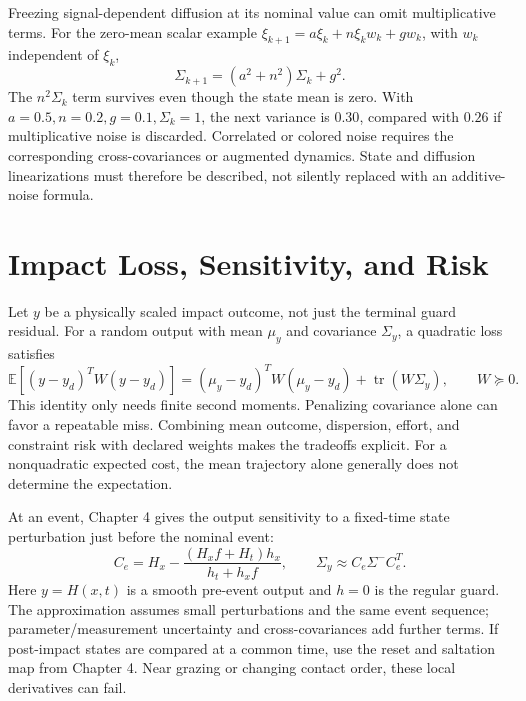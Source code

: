 \documentclass[12pt, openany]{book}
\theoremstyle{plain}
\begin{document}
Freezing signal-dependent diffusion at its nominal value can omit
multiplicative terms. For the zero-mean scalar example
$\xi_{k+1}=a\xi_k+n\xi_kw_k+g w_k$, with $w_k$ independent of $\xi_k$,
\begin{equation}\label{eq:multiplicative_covariance}
 \Sigma_{k+1}=(a^2+n^2)\Sigma_k+g^2.
\end{equation}
The $n^2\Sigma_k$ term survives even though the state mean is zero. With
$a=0.5,n=0.2,g=0.1,\Sigma_k=1$, the next variance is $0.30$, compared with
$0.26$ if multiplicative noise is discarded. Correlated or colored noise
requires the corresponding cross-covariances or augmented dynamics. State
and diffusion linearizations must therefore be described, not silently
replaced with an additive-noise formula.

\section{Impact Loss, Sensitivity, and Risk}

Let $y$ be a physically scaled impact outcome, not just the terminal guard
residual. For a random output with mean $\mu_y$
and covariance $\Sigma_y$, a quadratic loss satisfies
\begin{equation}\label{eq:ocp_output_loss}
 \mathbb E[(y-y_d)^TW(y-y_d)]
 =(\mu_y-y_d)^TW(\mu_y-y_d)+\operatorname{tr}(W\Sigma_y),
 \qquad W\succeq0.
\end{equation}
This identity only needs finite second moments. Penalizing covariance alone
can favor a repeatable miss. Combining mean outcome, dispersion, effort, and
constraint risk with declared weights makes the tradeoffs explicit. For a
nonquadratic expected cost, the mean trajectory alone generally does not
determine the expectation.

At an event, Chapter 4 gives the output sensitivity to a fixed-time state
perturbation just before the nominal event:
\begin{equation}\label{eq:ocp_event_output}
 C_e=H_x-\frac{(H_xf+H_t)h_x}{h_t+h_xf},\qquad
 \Sigma_y\approx C_e\Sigma^-C_e^T.
\end{equation}
Here $y=H(x,t)$ is a smooth pre-event output and $h=0$ is the regular guard.
The approximation assumes small perturbations and the same event sequence;
parameter/measurement uncertainty and cross-covariances add further terms.
If post-impact states are compared at a common time, use the reset and
saltation map from Chapter 4. Near grazing or changing contact order, these
local derivatives can fail.
\end{document}
